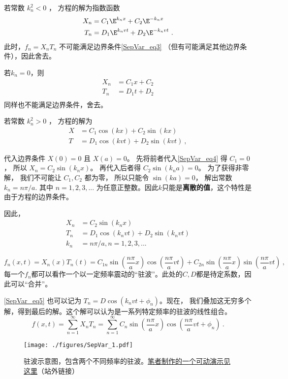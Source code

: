 若常数 $k_n^2 < 0$ ， 方程的解为指数函数
\begin{align}
X_n &= C_1 \E^{k_nx} + C_2 \E^{-k_nx}\\
T_n &= D_1 \E^{k_nvt} + D_2 \E^{-k_nvt}~.
\end{align}
此时，$f_n = X_nT_n$ 不可能满足边界条件\autoref{SepVar_eq3}  （但有可能满足其他边界条件），因此舍去。

若$k_n=0$，则
\begin{align}
X_n &= C_1x+C_2\\
T_n &= D_1t+D_2\\
\end{align}
同样也不能满足边界条件，舍去。

若常数 $k_n^2 > 0$ ， 方程的解为
\begin{align}\label{SepVar_eq4}
X &= C_1 \cos(kx) + C_2 \sin(kx)\\
T &= D_1 \cos(kvt) + D_2 \sin(kvt)~,
\end{align}

代入边界条件 $X(0) = 0$ 且 $X(a) = 0$。 先将前者代入\autoref{SepVar_eq4} 得 $C_1 = 0$， 所以 $X_n = C_2\sin(k_nx)$。 再代入后者得 $C_2\sin(k_na) = 0$。 为了获得非零解， 我们不可能让 $C_1, C_2$ 都为零， 所以只能令 $\sin(ka) = 0$， 解出常数 $k_n = n\pi/a$. 其中 $n=1,2,3,...$ 为任意正整数。因此$k$只能是\textbf{离散的值}，这个特性是由于方程的边界条件。

因此，
\begin{align}
\label{SepVar_eq5}X_n &= C_2 \sin(k_nx)\\
T_n &= D_1 \cos(k_nvt) + D_2 \sin(k_nvt)\\
k_n & = n\pi/a, n=1,2,3,...
\end{align}

\begin{equation}
f_n(x, t) = X_n(x) T_n(t) = C_{1n} \sin(\frac{n\pi}{a}x)\cos(\frac{n\pi}{a} vt) + C_{2n}\sin(\frac{n\pi}{a}x)\sin(\frac{n\pi}{a}vt)~,
\end{equation}
每一个$f_n$都可以看作一个以一定频率震动的“驻波”。此处的$C, D$都是待定系数，因此可以“合并”。

\autoref{SepVar_eq5} 也可以记为 $T_n=D\cos(k_nvt+\phi_n)$。现在， 我们叠加这无穷多个解，得到最后的解。这个解可以认为是一系列特定频率的驻波的线性组合。
\begin{equation}
f(x, t) = \sum_{n=1}^\infty X_nT_n = \sum_{n=1}^\infty C_n\sin(\frac{n\pi}{a}x)\cos(\frac{n\pi}{a}vt + \phi_n)~.
\end{equation}

\begin{figure}[ht]
\centering
\texttt{[image: ./figures/SepVar\_1.pdf]}
\caption{驻波示意图，包含两个不同频率的驻波。\href{https://www.geogebra.org/m/qc7nps6n}{笔者制作的一个可动演示见这里}（站外链接）} \label{SepVar_fig1}
\end{figure}